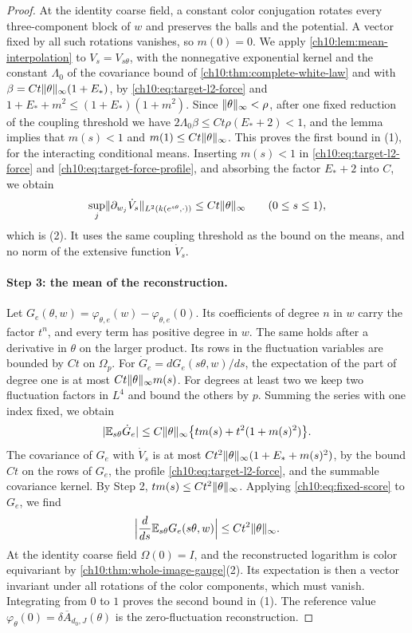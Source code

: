 \begin{proof}
At the identity coarse field, a constant color conjugation rotates every three-component block of $w$ and preserves the balls and the potential. A vector fixed by all such rotations vanishes, so $m(0)=0$. We apply \cref{ch10:lem:mean-interpolation} to $V_s=V_{s\theta}$, with the nonnegative exponential kernel and the constant $\Lambda_0$ of the covariance bound of \cref{ch10:thm:complete-white-law} and with $\beta=Ct\lVert \theta\rVert_\infty(1+E_*)$, by \eqref{ch10:eq:target-l2-force} and $1+E_*+m^2\le(1+E_*)(1+m^2)$. Since $\lVert \theta\rVert_\infty<\rho$, after one fixed reduction of the coupling threshold we have $2\Lambda_0\beta\le Ct\rho(E_*+2)<1$, and the lemma implies that $m(s)<1$ and $m(1)\le Ct\lVert \theta\rVert_\infty$. This proves the first bound in (1), for the interacting conditional means. Inserting $m(s)<1$ in \eqref{ch10:eq:target-l2-force} and \eqref{ch10:eq:target-force-profile}, and absorbing the factor $E_*+2$ into $C$, we obtain
\[
 \sup_j\lVert \partial_{w_j}\dot V_s\rVert_{L^2(k(e^{s\theta},\cdot))}\le Ct\lVert \theta\rVert_\infty\qquad(0\le s\le1),
\]
which is (2). It uses the same coupling threshold as the bound on the means, and no norm of the extensive function $\dot V_s$.

\paragraph{Step 3: the mean of the reconstruction.}
Let $G_e(\theta,w)=\varphi_{\theta,e}(w)-\varphi_{\theta,e}(0)$. Its coefficients of degree $n$ in $w$ carry the factor $t^n$, and every term has positive degree in $w$. The same holds after a derivative in $\theta$ on the larger product. Its rows in the fluctuation variables are bounded by $Ct$ on $\Omega_p$. For $\dot G_e=dG_e(s\theta,w)/ds$, the expectation of the part of degree one is at most $Ct\lVert \theta\rVert_\infty m(s)$. For degrees at least two we keep two fluctuation factors in $L^4$ and bound the others by $p$. Summing the series with one index fixed, we obtain
\begin{equation}\label{ch10:eq:nonlinear-observable-score}
 \lvert \mathbb E_{s\theta}\dot G_e\rvert\le C\lVert \theta\rVert_\infty\bigl\{tm(s)+t^2(1+m(s)^2)\bigr\}.
\end{equation}
The covariance of $G_e$ with $\dot V_s$ is at most $Ct^2\lVert \theta\rVert_\infty(1+E_*+m(s)^2)$, by the bound $Ct$ on the rows of $G_e$, the profile \eqref{ch10:eq:target-l2-force}, and the summable covariance kernel. By Step 2, $tm(s)\le Ct^2\lVert \theta\rVert_\infty$. Applying \eqref{ch10:eq:fixed-score} to $G_e$, we find
\[
 \Bigl\lvert\frac d{ds}\mathbb E_{s\theta}G_e(s\theta,w)\Bigr\rvert\le Ct^2\lVert \theta\rVert_\infty.
\]
At the identity coarse field $\Omega(0)=I$, and the reconstructed logarithm is color equivariant by \cref{ch10:thm:whole-image-gauge}(2). Its expectation is then a vector invariant under all rotations of the color components, which must vanish. Integrating from $0$ to $1$ proves the second bound in (1). The reference value $\varphi_{\theta}(0)=\delta\overline A_{d_0,J}(\theta)$ is the zero-fluctuation reconstruction.


\end{proof}
